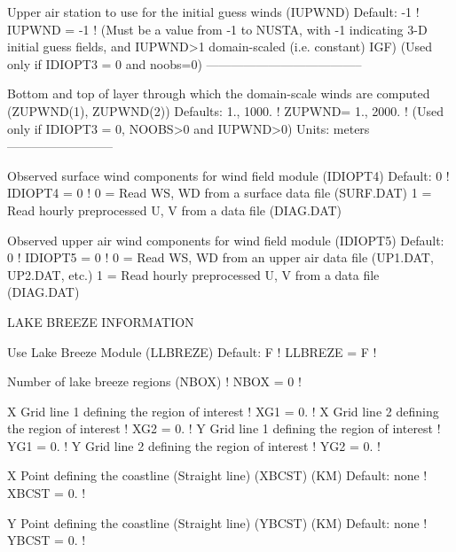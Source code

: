 \documentclass[a4paper,10pt]{article}
\begin{document}
          Upper air station to use for
          the initial guess winds (IUPWND)   Default: -1    ! IUPWND = -1  !
          (Must be a value from -1 to NUSTA, with
          -1 indicating 3-D initial guess fields,
          and IUPWND>1 domain-scaled (i.e. constant) IGF)
          (Used only if IDIOPT3 = 0 and noobs=0)
          --------------------------------------

          Bottom and top of layer through
          which the domain-scale winds
          are computed
          (ZUPWND(1), ZUPWND(2))        Defaults: 1., 1000. ! ZUPWND= 1., 2000. !
          (Used only if IDIOPT3 = 0, NOOBS>0 and IUPWND>0)    Units: meters
          --------------------------

       Observed surface wind components
       for wind field module (IDIOPT4)  Default: 0     ! IDIOPT4 =  0  !
          0 = Read WS, WD from a surface
              data file (SURF.DAT)
          1 = Read hourly preprocessed U, V from
              a data file (DIAG.DAT)

       Observed upper air wind components
       for wind field module (IDIOPT5)  Default: 0     ! IDIOPT5 =  0  !
          0 = Read WS, WD from an upper
              air data file (UP1.DAT, UP2.DAT, etc.)
          1 = Read hourly preprocessed U, V from
              a data file (DIAG.DAT)

       LAKE BREEZE INFORMATION

          Use Lake Breeze Module  (LLBREZE)
                                           Default: F      ! LLBREZE = F !

           Number of lake breeze regions (NBOX)            ! NBOX =  0  !

        X Grid line 1 defining the region of interest
                                                        ! XG1 = 0. !
        X Grid line 2 defining the region of interest
                                                        ! XG2 = 0. !
        Y Grid line 1 defining the region of interest
                                                        ! YG1 = 0. !
        Y Grid line 2 defining the region of interest
                                                        ! YG2 = 0. !

         X Point defining the coastline (Straight line)
                   (XBCST)  (KM)   Default: none    ! XBCST = 0. !

         Y Point defining the coastline (Straight line)
                   (YBCST)  (KM)   Default: none    ! YBCST = 0. !
\end{document}
